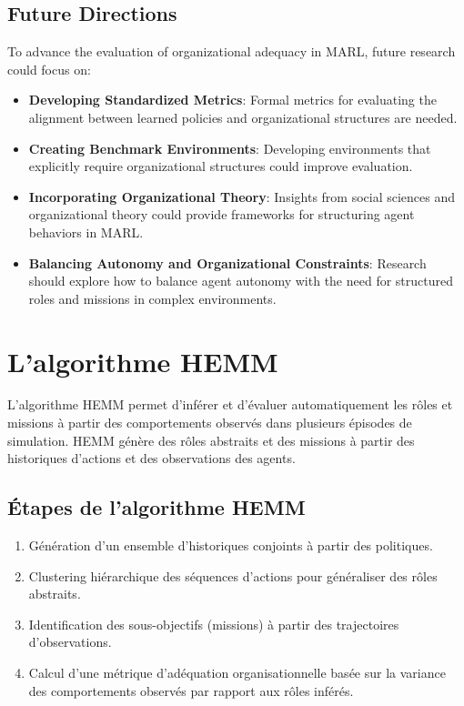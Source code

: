 \documentclass[sigconf,anonymous]{aamas}
\begin{document}
\subsection{Future Directions}

To advance the evaluation of organizational adequacy in MARL, future research could focus on:

\begin{itemize}
    \item \textbf{Developing Standardized Metrics}: Formal metrics for evaluating the alignment between learned policies and organizational structures are needed.
    \item \textbf{Creating Benchmark Environments}: Developing environments that explicitly require organizational structures could improve evaluation.
    \item \textbf{Incorporating Organizational Theory}: Insights from social sciences and organizational theory could provide frameworks for structuring agent behaviors in MARL.
    \item \textbf{Balancing Autonomy and Organizational Constraints}: Research should explore how to balance agent autonomy with the need for structured roles and missions in complex environments.
\end{itemize}


\section{L'algorithme HEMM}
\label{sec:hemm_algorithm}
L'algorithme HEMM permet d'inférer et d'évaluer automatiquement les rôles et missions à partir des comportements observés dans plusieurs épisodes de simulation. HEMM génère des rôles abstraits et des missions à partir des historiques d'actions et des observations des agents.

\subsection{Étapes de l'algorithme HEMM}
\begin{enumerate}
    \item Génération d'un ensemble d'historiques conjoints à partir des politiques.
    \item Clustering hiérarchique des séquences d'actions pour généraliser des rôles abstraits.
    \item Identification des sous-objectifs (missions) à partir des trajectoires d'observations.
    \item Calcul d'une métrique d'adéquation organisationnelle basée sur la variance des comportements observés par rapport aux rôles inférés.
\end{enumerate}
\end{document}
